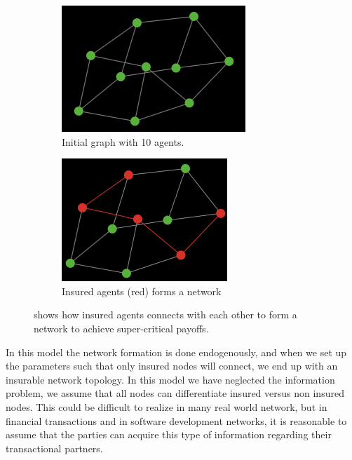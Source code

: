 \begin{figure}[h]
\centering
\begin{subfigure}{.5\textwidth}
  \centering
  \includegraphics[width=0.8\linewidth]{../Figures/financialContagion1.png}
  \caption{\label{fig:fincont1} Initial graph with 10 agents.}
\end{subfigure}
\quad
\begin{subfigure}{.46\textwidth}
  \centering
  \includegraphics[width=0.8\linewidth]{../Figures/financialContagion2.png}
  \caption{\label{fig:fincont2} Insured agents (red) forms a network}
\end{subfigure}
\caption{\label{fig:fincont} shows how insured agents connects with each other to form a network to achieve super-critical payoffs.}
\end{figure}

In this model the network formation is done endogenously, and when we set up the parameters such that only insured nodes will connect, we end up with an insurable network topology. 
In this model we have neglected the information problem, we assume that all nodes can differentiate insured versus non insured nodes. This could be difficult to realize in many real world network, but in financial transactions and in software development networks, it is reasonable to assume that the parties can acquire this type of information regarding their transactional partners.

